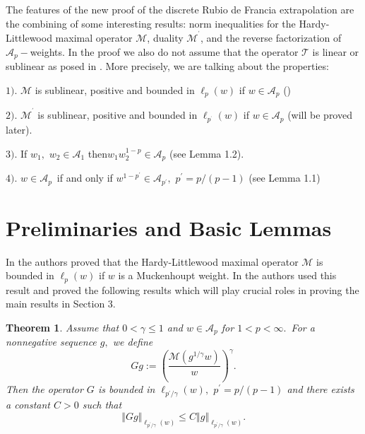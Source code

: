 \documentclass[a4paper]{amsart}
\theoremstyle{plain}
\newtheorem{theorem}{Theorem}[section]
\numberwithin{equation}{section}
\begin{document}
\bigskip

The features of the new proof of the discrete Rubio de Francia extrapolation
are the combining of some interesting results: norm inequalities for the
Hardy-Littlewood maximal operator $\mathcal{M}$, duality $\mathcal{M}%
^{^{\prime }}$, and the reverse factorization of $\mathcal{A}_{p}-$weights.
In the proof we also do not assume that the operator $\mathcal{T}$ is linear
or sublinear as posed in \cite{saker}. More precisely, we are talking about
the properties:

$1).$ $\mathcal{M}$ is sublinear, positive and bounded in $\ell _{p}(w)$ if $%
w\in \mathcal{A}_{p}$ (\cite{Saker2020})

$2).$ $\mathcal{M}^{^{\prime }}$ is sublinear, positive and bounded in $\ell
_{p^{^{\prime }}}(w)$ if $w\in \mathcal{A}_{p}$ (will be proved later).

$3).$ If $w_{1},$ $w_{2}\in \mathcal{A}_{1}$ then$w_{1}w_{2}^{1-p}\in 
\mathcal{A}_{p}$ (see Lemma 1.2).

$4).$ $w\in \mathcal{A}_{p}$\ if and only if $w^{1-p^{\prime }}\in \mathcal{A%
}_{p^{\prime }},$ $p^{\prime }=p/\left( p-1\right) $ (see Lemma 1.1)

\section{Preliminaries and Basic Lemmas}

In \cite{Saker2020} the authors proved that the Hardy-Littlewood maximal
operator $\mathcal{M}$ is bounded in $\ell _{p}(w)$ if $w$ is a Muckenhoupt
weight. In \cite{saker} the authors used this result and proved the
following results which will play crucial roles in proving the main results
in Section 3.

\begin{theorem}
\label{s} Assume that $0<\gamma \leq 1$ and $w\in \mathcal{A}_{p}$ for $%
1<p<\infty .$\ For a nonnegative sequence $g,$ we define%
\begin{equation*}
Gg:=\left( \frac{\mathcal{M}\left( g^{1/\gamma }w\right) }{w}\right)
^{\gamma }.
\end{equation*}%
Then the operator $G$ is bounded in $\ell _{p^{\prime }/\gamma }(w),$ $%
p^{\prime }=p/\left( p-1\right) $ and there exists a constant $C>0$ such that%
\begin{equation*}
\left\Vert Gg\right\Vert _{\ell _{p^{\prime }/\gamma }(w)}\leq C\left\Vert
g\right\Vert _{\ell _{p^{\prime }/\gamma }(w)}.
\end{equation*}
\end{theorem}
\end{document}
